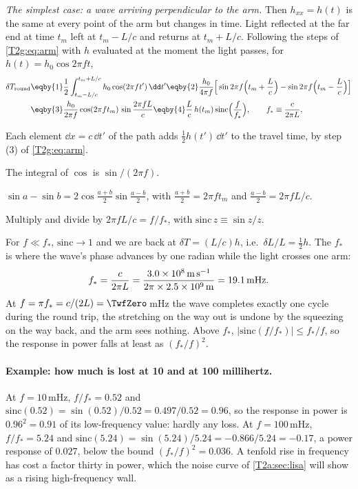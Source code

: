 \emph{The simplest case: a wave arriving perpendicular to the arm.} Then $h_{xx}=h(t)$ is the same at every point of the arm but changes in time. Light reflected at the far end at time $t_m$ left at $t_m-L/c$ and returns at $t_m+L/c$. Following the steps of \eqref{T2g:eq:arm} with $h$ evaluated at the moment the light passes, for $h(t)=h_0\cos2\pi ft$,
\begin{align}
  \delta T_{\rm round}
  &\eqby{1}\frac12\int_{t_m-L/c}^{t_m+L/c}h_0\cos(2\pi ft')\,\dd t'
  \eqby{2}\frac{h_0}{4\pi f}\Big[\sin2\pi f\Big(t_m+\frac Lc\Big)-\sin2\pi f\Big(t_m-\frac Lc\Big)\Big]\nonumber\\
  &\eqby{3}\frac{h_0}{2\pi f}\cos(2\pi ft_m)\,\sin\frac{2\pi fL}{c}
  \eqby{4}\frac{L}{c}\,h(t_m)\,\mathrm{sinc}\Big(\frac{f}{f_*}\Big),
  \qquad f_*\equiv\frac{c}{2\pi L},
  \label{T2g:eq:transfer}
\end{align}
\begin{explain}
  \item Each element $\dd x=c\,\dd t'$ of the path adds $\tfrac12h(t')\,\dd t'$ to the travel time, by step (3) of \eqref{T2g:eq:arm}.
  \item The integral of $\cos$ is $\sin/(2\pi f)$.
  \item $\sin a-\sin b=2\cos\tfrac{a+b}2\sin\tfrac{a-b}2$, with $\tfrac{a+b}2=2\pi ft_m$ and $\tfrac{a-b}2=2\pi fL/c$.
  \item Multiply and divide by $2\pi fL/c=f/f_*$, with $\mathrm{sinc}\,z\equiv\sin z/z$.
\end{explain}
For $f\ll f_*$, $\mathrm{sinc}\to1$ and we are back at $\delta T=(L/c)h$, i.e.\ $\delta L/L=\tfrac12h$. The  $f_*$ is where the wave's phase advances by one radian while the light crosses one arm:
\begin{equation}
  f_*=\frac{c}{2\pi L}=\frac{3.0\times10^8\,{\rm m\,s^{-1}}}{2\pi\times2.5\times10^9\,{\rm m}}=19.1\,{\rm mHz}.
\end{equation}
At $f=\pi f_*=c/(2L)=\TwfZero$\,mHz the wave completes exactly one cycle during the round trip, the stretching on the way out is undone by the squeezing on the way back, and the arm sees nothing. Above $f_*$, $\lvert\mathrm{sinc}(f/f_*)\rvert\le f_*/f$, so the response in power falls at least as $(f_*/f)^2$.

\paragraph{Example: how much is lost at 10 and at 100 millihertz.}
At $f=10$\,mHz, $f/f_*=0.52$ and $\mathrm{sinc}(0.52)=\sin(0.52)/0.52=0.497/0.52=0.96$, so the response in power is $0.96^2=0.91$ of its low-frequency value: hardly any loss. At $f=100$\,mHz, $f/f_*=5.24$ and $\mathrm{sinc}(5.24)=\sin(5.24)/5.24=-0.866/5.24=-0.17$, a power response of $0.027$, below the bound $(f_*/f)^2=0.036$. A tenfold rise in frequency has cost a factor thirty in power, which the noise curve of \cref{T2a:sec:lisa} will show as a rising high-frequency wall.

